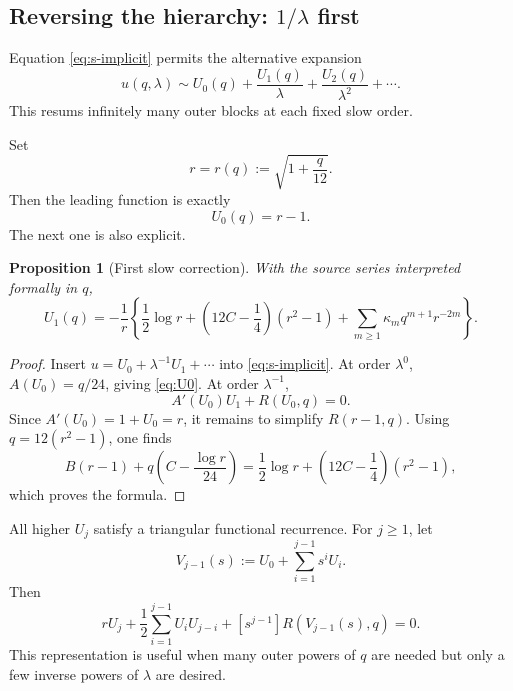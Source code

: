 \documentclass[11pt,oneside]{article}
\theoremstyle{plain}
\newtheorem{proposition}[theorem]{Proposition}
\theoremstyle{definition}
\theoremstyle{remark}
\begin{document}
\subsection{Reversing the hierarchy: \(1/\lambda\) first}

Equation \cref{eq:s-implicit} permits the alternative expansion
\begin{equation}
 u(q,\lambda)
 \sim U_0(q)+\frac{U_1(q)}{\lambda}
 +\frac{U_2(q)}{\lambda^2}+\cdots.
 \label{eq:Uj-resummation}
\end{equation}
This resums infinitely many outer blocks at each fixed slow order.

Set
\begin{equation}
 r=r(q):=\sqrt{1+\frac q{12}}.
 \label{eq:r-def}
\end{equation}
Then the leading function is exactly
\begin{equation}
 U_0(q)=r-1.
 \label{eq:U0}
\end{equation}
The next one is also explicit.

\begin{proposition}[First slow correction]
\label{prop:U1}
With the source series interpreted formally in \(q\),
\begin{equation}
 U_1(q)=-\frac1r\left\{
 \frac12\log r+
 \left(12C-\frac14\right)(r^2-1)
 +\sum_{m\ge1}\kappa_mq^{m+1}r^{-2m}
 \right\}.
 \label{eq:U1}
\end{equation}
\end{proposition}

\begin{proof}
Insert \(u=U_0+\lambda^{-1}U_1+\cdots\) into
\cref{eq:s-implicit}.  At order \(\lambda^0\),
\(A(U_0)=q/24\), giving \cref{eq:U0}.  At order \(\lambda^{-1}\),
\begin{equation}
 A'(U_0)U_1+R(U_0,q)=0.
\end{equation}
Since \(A'(U_0)=1+U_0=r\), it remains to simplify \(R(r-1,q)\).  Using
\(q=12(r^2-1)\), one finds
\begin{equation}
 B(r-1)+q\left(C-\frac{\log r}{24}\right)
 =\frac12\log r+\left(12C-\frac14\right)(r^2-1),
\end{equation}
which proves the formula.
\end{proof}

All higher \(U_j\) satisfy a triangular functional recurrence.  For \(j\ge1\),
let
\begin{equation}
 V_{j-1}(s):=U_0+\sum_{i=1}^{j-1}s^iU_i.
 \label{eq:Vj}
\end{equation}
Then
\begin{equation}
 rU_j
 +\frac12\sum_{i=1}^{j-1}U_iU_{j-i}
 +[s^{j-1}]R(V_{j-1}(s),q)=0.
 \label{eq:Uj-recurrence}
\end{equation}
This representation is useful when many outer powers of \(q\) are needed but
only a few inverse powers of \(\lambda\) are desired.
\end{document}
